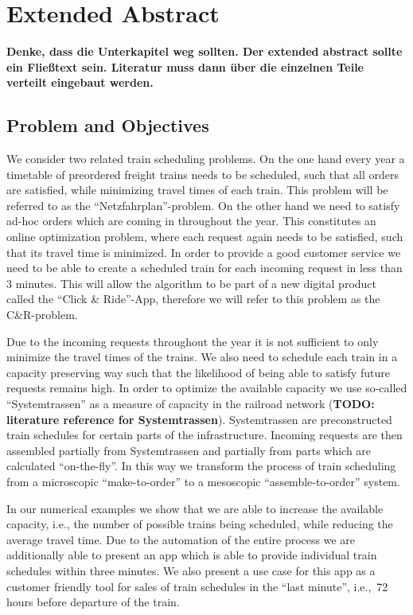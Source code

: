 \section{Extended Abstract}
\label{chap:extAbs}

\textbf{Denke, dass die Unterkapitel weg sollten. Der extended abstract sollte ein Fließtext sein. Literatur muss dann über die einzelnen Teile verteilt eingebaut werden.}

\subsection{Problem and Objectives}
We consider two related train scheduling problems. On the one hand every year a timetable of preordered freight trains needs to be scheduled, such that all orders are satisfied, while minimizing travel times of each train. This problem will be referred to as the ``Netzfahrplan''-problem. On the other hand we need to satisfy ad-hoc orders which are coming in throughout the year. This constitutes an online optimization problem, where each request again needs to be satisfied, such that its travel time is minimized. In order to provide a good customer service we need to be able to create a scheduled train for each incoming request in less than 3 minutes. This will allow the algorithm to be part of a new digital product called the ``Click \& Ride''-App, therefore we will refer to this problem as the C\&R-problem.

Due to the incoming requests throughout the year it is not sufficient to only minimize the travel times of the trains. We also need to schedule each train in a capacity preserving way such that the likelihood of being able to satisfy future requests remains high. In order to optimize the available capacity we use so-called ``Systemtrassen'' as a measure of capacity in the railroad network (\textbf{TODO: literature reference for Systemtrassen}). Systemtrassen are preconstructed train schedules for certain parts of the infrastructure. Incoming requests are then assembled partially from Systemtrassen and partially from parts which are calculated ``on-the-fly''.
In this way we transform the process of train scheduling from a microscopic ``make-to-order'' to a mesoscopic ``assemble-to-order'' system.

In our numerical examples we show that we are able to increase the available capacity, i.e., the number of possible trains being scheduled, while reducing the average travel time. Due to the automation of the entire process we are additionally able to present an app which is able to provide individual train schedules within three minutes. We also present a use case for this app as a customer friendly tool for sales of train schedules in the ``last minute'', i.e.,\ 72 hours before departure of the train.

